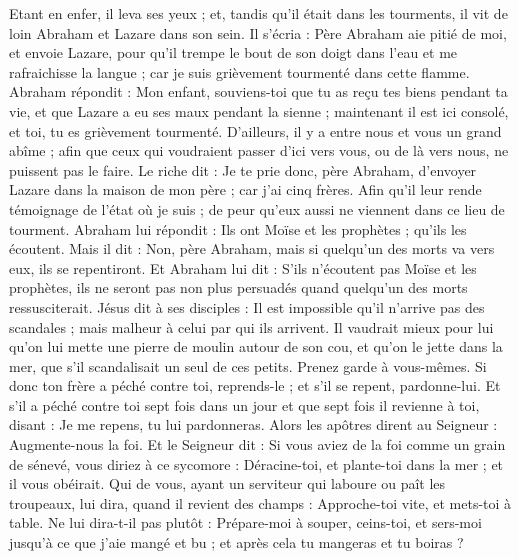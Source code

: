 \begin{multicols}{2}
{Etant en enfer, il leva ses yeux ; et, tandis qu’il était dans les tourments, il vit de loin Abraham et Lazare dans son sein.
Il s’écria : Père Abraham aie pitié de moi, et envoie Lazare, pour qu’il trempe le bout de son doigt dans l’eau et me rafraichisse la langue ; car je suis grièvement tourmenté dans cette flamme.
Abraham répondit : Mon enfant, souviens-toi que tu as reçu tes biens pendant ta vie, et que Lazare a eu ses maux pendant la sienne ; maintenant il est ici consolé, et toi, tu es grièvement tourmenté.
D’ailleurs, il y a entre nous et vous un grand abîme ; afin que ceux qui voudraient passer d'ici vers vous, ou de là vers nous, ne puissent pas le faire.
Le riche dit : Je te prie donc, père Abraham, d’envoyer Lazare dans la maison de mon père ; car j’ai cinq frères.
Afin qu'il leur rende témoignage de l'état où je suis ; de peur qu'eux aussi ne viennent dans ce lieu de tourment.
Abraham lui répondit : Ils ont Moïse et les prophètes ; qu'ils les écoutent.
Mais il dit : Non, père Abraham, mais si quelqu'un des morts va vers eux, ils se repentiront.
Et Abraham lui dit : S’ils n'écoutent pas Moïse et les prophètes, ils ne seront pas non plus persuadés quand quelqu'un des morts ressusciterait.
\VerseOne{}Jésus dit à ses disciples : Il est impossible qu'il n'arrive pas des scandales ; mais malheur à celui par qui ils arrivent.
Il vaudrait mieux pour lui qu'on lui mette une pierre de moulin autour de son cou, et qu’on le jette dans la mer, que s’il scandalisait un seul de ces petits.
Prenez garde à vous-mêmes. Si donc ton frère a péché contre toi, reprends-le ; et s'il se repent, pardonne-lui.
Et s’il a péché contre toi sept fois dans un jour et que sept fois il revienne à toi, disant : Je me repens, tu lui pardonneras.
Alors les apôtres dirent au Seigneur : Augmente-nous la foi.
Et le Seigneur dit : Si vous aviez de la foi comme un grain de sénevé, vous diriez à ce sycomore : Déracine-toi, et plante-toi dans la mer ; et il vous obéirait.
Qui de vous, ayant un serviteur qui laboure ou paît les troupeaux, lui dira, quand il revient des champs : Approche-toi vite, et mets-toi à table.
Ne lui dira-t-il pas plutôt : Prépare-moi à souper, ceins-toi, et sers-moi jusqu'à ce que j'aie mangé et bu ; et après cela tu mangeras et tu boiras ?
}
\end{multicols}
